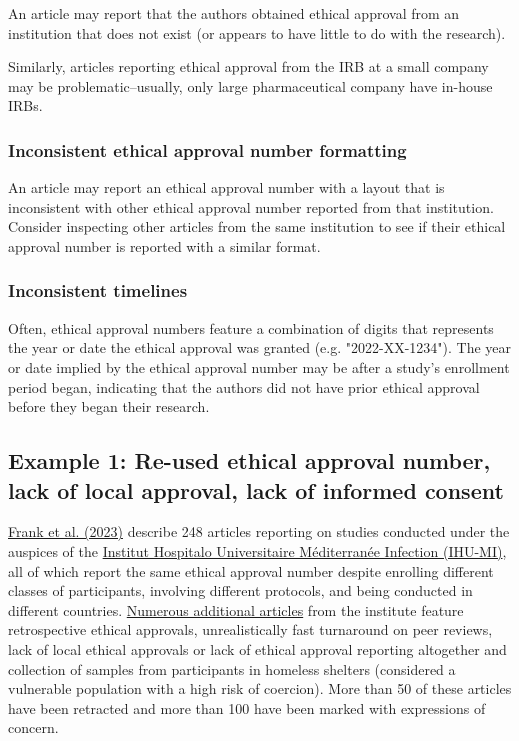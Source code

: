 \documentclass[letterpaper, 12pt]{article}
\begin{document}
An article may report that the authors obtained ethical approval from an institution that does not exist (or appears to have little to do with the research).

Similarly, articles reporting ethical approval from the IRB at a small company may be problematic--usually, only large pharmaceutical company have in-house IRBs.

\subsubsection*{Inconsistent ethical approval number formatting}

An article may report an ethical approval number with a layout that is inconsistent with other ethical approval number reported from that institution. Consider inspecting other articles from the same institution to see if their ethical approval number is reported with a similar format.

\subsubsection*{Inconsistent timelines}

Often, ethical approval numbers feature a combination of digits that represents the year or date the ethical approval was granted (e.g. "2022-XX-1234"). The year or date implied by the ethical approval number may be after a study's enrollment period began, indicating that the authors did not have prior ethical approval before they began their research.

\subsection*{Example 1: Re-used ethical approval number, lack of local approval, lack of informed consent}

\href{https://doi.org/10.1186/s41073-023-00134-4}{Frank et al. (2023)} describe 248 articles reporting on studies conducted under the auspices of the \href{https://www.mediterranee-infection.com/}{Institut Hospitalo Universitaire Méditerranée Infection (IHU-MI)}, all of which report the same ethical approval number despite enrolling different classes of participants, involving different protocols, and being conducted in different countries. \href{https://ihu-correction.com/}{Numerous additional articles} from the institute feature retrospective ethical approvals, unrealistically fast turnaround on peer reviews, lack of local ethical approvals or lack of ethical approval reporting altogether and collection of samples from participants in homeless shelters (considered a vulnerable population with a high risk of coercion). More than 50 of these articles have been retracted and more than 100 have been marked with expressions of concern.
\end{document}
